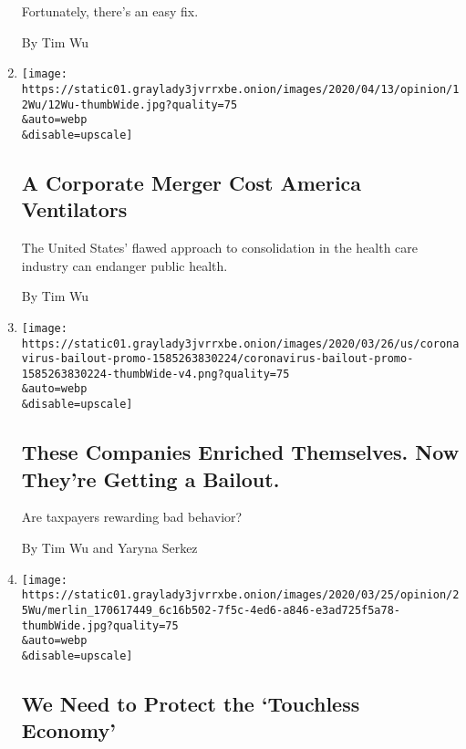 \begin{enumerate}
  Fortunately, there's an easy fix.

  By Tim Wu
\item
  \href{/2020/04/12/opinion/ventilators-coronavirus.html}{}

  \texttt{[image: https://static01.graylady3jvrrxbe.onion/images/2020/04/13/opinion/12Wu/12Wu-thumbWide.jpg?quality=75\\\&auto=webp\\\&disable=upscale]}

  \hypertarget{a-corporate-merger-cost-america-ventilators}{%
  \subsection{A Corporate Merger Cost America
  Ventilators}\label{a-corporate-merger-cost-america-ventilators}}

  The United States' flawed approach to consolidation in the health care
  industry can endanger public health.

  By Tim Wu
\item
  \href{/interactive/2020/03/27/opinion/coronavirus-bailout.html}{}

  \texttt{[image: https://static01.graylady3jvrrxbe.onion/images/2020/03/26/us/coronavirus-bailout-promo-1585263830224/coronavirus-bailout-promo-1585263830224-thumbWide-v4.png?quality=75\\\&auto=webp\\\&disable=upscale]}

  \hypertarget{these-companies-enriched-themselves-now-theyre-getting-a-bailout}{%
  \subsection{These Companies Enriched Themselves. Now They're Getting a
  Bailout.}\label{these-companies-enriched-themselves-now-theyre-getting-a-bailout}}

  Are taxpayers rewarding bad behavior?

  By Tim Wu and Yaryna Serkez
\item
  \href{/2020/03/25/opinion/coronavirus-economy-delivery.html}{}

  \texttt{[image: https://static01.graylady3jvrrxbe.onion/images/2020/03/25/opinion/25Wu/merlin\_170617449\_6c16b502-7f5c-4ed6-a846-e3ad725f5a78-thumbWide.jpg?quality=75\\\&auto=webp\\\&disable=upscale]}

  \hypertarget{we-need-to-protect-the-touchless-economy}{%
  \subsection{We Need to Protect the `Touchless
  Economy'}\label{we-need-to-protect-the-touchless-economy}}


\end{enumerate}
